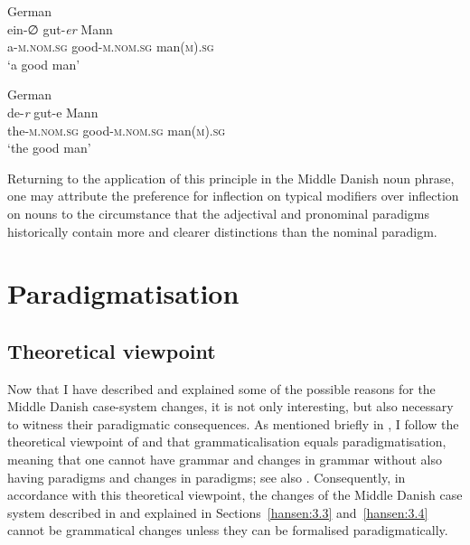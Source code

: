 \documentclass[output=paper]{langsci/langscibook}
\begin{document}
\ea \label{ex:hansen:23}
{German}\\
\gll ein-∅ gut-\textit{er} Mann\\
     a-\textsc{m.nom.sg} good-\textsc{m.nom.sg} man\textsc{(m).sg}\\
\glt ‘a good man’

\ex\label{ex:hansen:24}
{German}\\
\gll de-\textit{r} gut-e Mann\\
     the-\textsc{m.nom.sg} good-\textsc{m.nom.sg} man\textsc{(m).sg}\\
\glt ‘the good man’

\z

\begin{sloppypar}
Returning to the application of this principle in the Middle Danish noun phrase, one may attribute the preference for inflection on typical modifiers over inflection on nouns to the circumstance that the adjectival and pronominal paradigms historically contain more and clearer distinctions than the nominal paradigm.
\end{sloppypar}

\section{Paradigmatisation} \label{hansen:4}\largerpage
\subsection{Theoretical viewpoint} \label{hansen:4.1}

Now that I have described and explained some of the possible reasons for the Middle Danish case-system changes, it is not only interesting, but also necessary to witness their paradigmatic consequences. As mentioned briefly in , I follow the theoretical viewpoint of \citet[xi, 71–72]{Nørgård-Sørensen2011} and \citet[261–262]{Nørgård-Sørensen2015} that grammaticalisation equals paradigmatisation, meaning that one cannot have grammar and changes in grammar without also having paradigms and changes in paradigms; see also \citet[2--4]{DiewaldSmirnova2010}. Consequently, in accordance with this theoretical viewpoint, the changes of the Middle Danish case system described in  and explained in Sections~\ref{hansen:3.3} and~\ref{hansen:3.4} cannot be grammatical changes unless they can be formalised paradigmatically.
\end{document}
